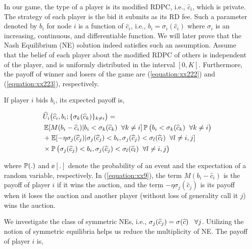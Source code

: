 \documentclass[journal,12pt, onecolumn]{IEEEtran}
\begin{document}
In our game, the type of a player is its modified RDPC, i.e., $\widehat{c}_i$, which is private. The strategy of each player is the bid it submits as its RD fee. Such a parameter denoted by $b_i$ for node $i$ is a function of $\widehat{c}_i$, i.e., $b_i=\sigma_i (\widehat{c}_i)$ where $\sigma_i$ is an increasing, continuous, and differentiable function. We will later prove that the Nash Equilibrium (NE) solution indeed satisfies such an assumption. Assume that the belief of each player about the modified RDPC of others is independent of the player, and is  uniformly distributed in the interval $[0, K]$. Furthermore, the payoff of winner and losers of the game are (\ref{equation:xx222}) and (\ref{equation:xx223}), respectively. 

If player $i$ bids $b_i$, its expected payoff is,

\begin{small}
\begin{align} 
\label{equation:xx9}
 &\widehat{U}_i \big( \widehat{c}_i , b_i ;\{\sigma _k(\widehat{c}_k)\}_{k \neq i} \big)=
\nonumber \\
&
\operatorname{\mathbb{E}} [M(b_i - \widehat{c}_i)|b_i< \sigma _k(\widehat{c}_k) \hspace{2mm} \forall k \neq i ] \operatorname{\mathbb{P}} \big(b_i< \sigma _k(\widehat{c}_k) \hspace{2mm} \forall k \neq i\big) 
\nonumber
\\ & + \operatorname{\mathbb{E}} [-\eta\sigma _j(\widehat{c}_j)|\sigma _j(\widehat{c}_j)< b_i, \sigma _j(\widehat{c}_j)< \sigma _l(\widehat{c}_l) \hspace{2mm} \forall l \neq i,j ] 
\nonumber
\\ &
\times \operatorname{\mathbb{P}} \big(\sigma _j(\widehat{c}_j)< b_i, \sigma _j(\widehat{c}_j)< \sigma _l(\widehat{c}_l) \hspace{2mm} \forall l \neq i,j\big) 
\end{align}
\end{small}
where $\operatorname{\mathbb{P}}(.)$ and $\ee[.]$ denote the probability of an event and the expectation of a random variable, respectively. In (\ref{equation:xx9}), the term $M(b_i - \widehat{c}_i)$ is the payoff of player $i$ if it wins the auction, and the term $-\eta\sigma _j(\widehat{c}_j)$ is its payoff when it loses the auction and another player (without loss of generality call it $j$) wins the auction. 

We investigate the class of symmetric NEs, i.e., $\sigma_j (\widehat{c}_j)=\sigma (\widehat{c}) \hspace{3mm} \forall j$. Utilizing the notion of symmetric equilibria helps us reduce the multiplicity of NE. The payoff of player $i$ is,
\end{document}
